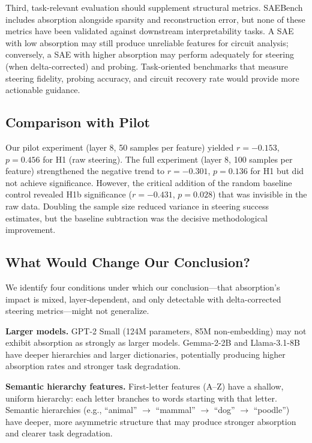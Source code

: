 \documentclass{article}
\begin{document}
Third, task-relevant evaluation should supplement structural metrics. SAEBench includes absorption alongside sparsity and reconstruction error, but none of these metrics have been validated against downstream interpretability tasks. A SAE with low absorption may still produce unreliable features for circuit analysis; conversely, a SAE with higher absorption may perform adequately for steering (when delta-corrected) and probing. Task-oriented benchmarks that measure steering fidelity, probing accuracy, and circuit recovery rate would provide more actionable guidance.

\subsection{Comparison with Pilot}

Our pilot experiment (layer 8, 50 samples per feature) yielded $r = -0.153$, $p = 0.456$ for H1 (raw steering). The full experiment (layer 8, 100 samples per feature) strengthened the negative trend to $r = -0.301$, $p = 0.136$ for H1 but did not achieve significance. However, the critical addition of the random baseline control revealed H1b significance ($r = -0.431$, $p = 0.028$) that was invisible in the raw data. Doubling the sample size reduced variance in steering success estimates, but the baseline subtraction was the decisive methodological improvement.

\subsection{What Would Change Our Conclusion?}

We identify four conditions under which our conclusion---that absorption's impact is mixed, layer-dependent, and only detectable with delta-corrected steering metrics---might not generalize.

\textbf{Larger models.} GPT-2 Small (124M parameters, 85M non-embedding) may not exhibit absorption as strongly as larger models. Gemma-2-2B and Llama-3.1-8B have deeper hierarchies and larger dictionaries, potentially producing higher absorption rates and stronger task degradation.

\textbf{Semantic hierarchy features.} First-letter features (A--Z) have a shallow, uniform hierarchy: each letter branches to words starting with that letter. Semantic hierarchies (e.g., ``animal'' $\rightarrow$ ``mammal'' $\rightarrow$ ``dog'' $\rightarrow$ ``poodle'') have deeper, more asymmetric structure that may produce stronger absorption and clearer task degradation.
\end{document}
